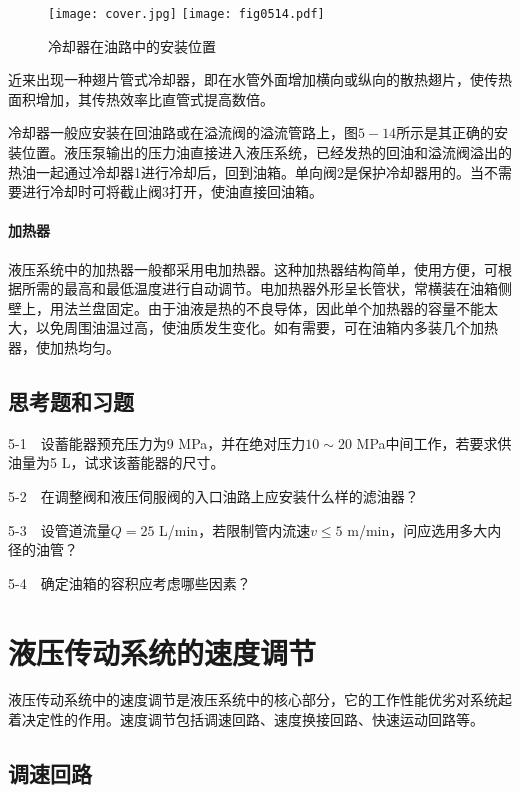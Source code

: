 \begin{figure}[!hbt]
\centering         
\ifOpenSource
\texttt{[image: cover.jpg]}
\else
\texttt{[image: fig0514.pdf]}
\fi 
\caption{冷却器在油路中的安装位置}   
\label{fig:fig0514}
\end{figure}

近来出现一种翅片管式冷却器，即在水管外面增加横向或纵向的散热翅片，使传热面积增加，其传热效率比直管式提高数倍。

冷却器一般应安装在回油路或在溢流阀的溢流管路上，图$5-14$所示是其正确的安装位置。液压泵输出的压力油直接进入液压系统，已经发热的回油和溢流阀溢出的热油一起通过冷却器1进行冷却后，回到油箱。单向阀2是保护冷却器用的。当不需要进行冷却时可将截止阀3打开，使油直接回油箱。

\subsubsection{加热器}
液压系统中的加热器一般都采用电加热器。这种加热器结构简单，使用方便，可根据所需的最高和最低温度进行自动调节。电加热器外形呈长管状，常横装在油箱侧壁上，用法兰盘固定。由于油液是热的不良导体，因此单个加热器的容量不能太大，以免周围油温过高，使油质发生变化。如有需要，可在油箱内多装几个加热器，使加热均匀。

\section*{思考题和习题}


5-1\ \ 设蓄能器预充压力为9 MPa，并在绝对压力$10 \sim 20 $ MPa中间工作，若要求供油量为5 L，试求该蓄能器的尺寸。

5-2\  \ 在调整阀和液压伺服阀的入口油路上应安装什么样的滤油器？

5-3\  \ 设管道流量$Q = 25 $ L/min，若限制管内流速$v\leq 5 $ m/min，问应选用多大内径的油管？

5-4\ \ 确定油箱的容积应考虑哪些因素？

\chapter{液压传动系统的速度调节}

液压传动系统中的速度调节是液压系统中的核心部分，它的工作性能优劣对系统起着决定性的作用。速度调节包括调速回路、速度换接回路、快速运动回路等。

\section{调速回路}

